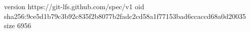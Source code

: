 version https://git-lfs.github.com/spec/v1
oid sha256:9ce5d1b79c3b92c835f2b8077b2fadc2cd58a1f77153bad6ccaccd68a0d20035
size 6956
